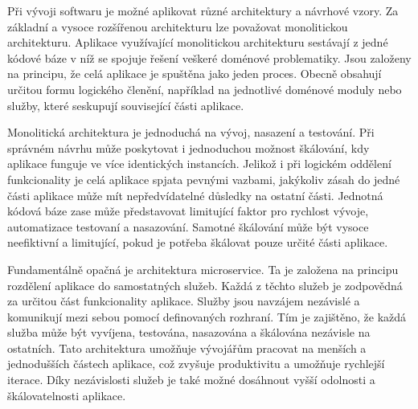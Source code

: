 

Při vývoji softwaru je možné aplikovat různé architektury a návrhové vzory. Za základní a vysoce rozšířenou architekturu lze považovat monolitickou architekturu. Aplikace využívající monolitickou architekturu sestávají z jedné kódové báze v níž se spojuje řešení veškeré doménové problematiky. \cite{Williams2023}  Jsou založeny na principu, že celá aplikace je spuštěna jako jeden proces. Obecně obsahují určitou formu logického členění, například na jednotlivé doménové moduly nebo služby, které seskupují související části aplikace. \cite{Williams2023} 


Monolitická architektura je jednoduchá na vývoj, nasazení a testování. Při správném návrhu může poskytovat i jednoduchou možnost škálování, kdy aplikace funguje ve více identických instancích. \cite{Richardson2018} Jelikož i při logickém oddělení funkcionality je celá aplikace spjata pevnými vazbami, jakýkoliv zásah do jedné části aplikace může mít nepředvídatelné důsledky na ostatní části. Jednotná kódová báze zase může představovat limitující faktor pro rychlost vývoje, automatizace testovaní a nasazování. Samotné škálování může být vysoce neefiktivní a limitující, pokud je potřeba škálovat pouze určité části aplikace. \cite{Richardson2018}

Fundamentálně opačná je architektura microservice. Ta je založena na principu rozdělení aplikace do samostatných služeb. Každá z těchto služeb je zodpovědná za určitou část funkcionality aplikace. Služby jsou navzájem nezávislé a komunikují mezi sebou pomocí definovaných rozhraní. \cite{Richardson2018} Tím je zajištěno, že každá služba může být vyvíjena, testována, nasazována a škálována nezávisle na ostatních. Tato architektura umožňuje vývojářům pracovat na menších a jednodušších částech aplikace, což zvyšuje produktivitu a umožňuje rychlejší iterace. Díky nezávislosti služeb je také možné dosáhnout vyšší odolnosti a škálovatelnosti aplikace. 


